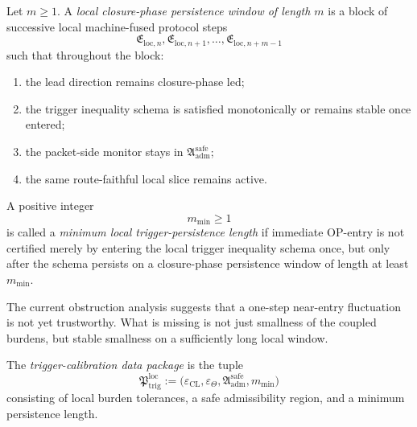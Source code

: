 \begin{definition}
\label{def:local-closure-phase-persistence-window-of-length-m}
Let \(m\ge 1\).
A \emph{local closure-phase persistence window of length \(m\)} is a block of successive local machine-fused protocol steps
\[
\mathfrak{E}_{\mathrm{loc},n},\mathfrak{E}_{\mathrm{loc},n+1},\dots,\mathfrak{E}_{\mathrm{loc},n+m-1}
\]
such that throughout the block:
\begin{enumerate}
    \item the lead direction remains closure-phase led;
    \item the trigger inequality schema is satisfied monotonically or remains stable once entered;
    \item the packet-side monitor stays in \(\mathfrak{A}_{\mathrm{adm}}^{\mathrm{safe}}\);
    \item the same route-faithful local slice remains active.
\end{enumerate}
\end{definition}

\begin{definition}
\label{def:minimum-local-trigger-persistence-length}
A positive integer
\[
m_{\min}\ge 1
\]
is called a \emph{minimum local trigger-persistence length} if immediate OP-entry is not certified merely by entering the local trigger inequality schema once, but only after the schema persists on a closure-phase persistence window of length at least \(m_{\min}\).
\end{definition}

\begin{remark}
\label{rem:why-a-persistence-length-is-needed}
The current obstruction analysis suggests that a one-step near-entry fluctuation is not yet trustworthy.
What is missing is not just smallness of the coupled burdens, but stable smallness on a sufficiently long local window.
\end{remark}

\begin{definition}
\label{def:trigger-calibration-data-package}
The \emph{trigger-calibration data package} is the tuple
\[
\mathfrak{P}_{\mathrm{trig}}^{\mathrm{loc}}
:=
\bigl(
\varepsilon_{\mathrm{CL}},
\varepsilon_{\Theta},
\mathfrak{A}_{\mathrm{adm}}^{\mathrm{safe}},
 m_{\min}
\bigr)
\]
consisting of local burden tolerances, a safe admissibility region, and a minimum persistence length.
\end{definition}

